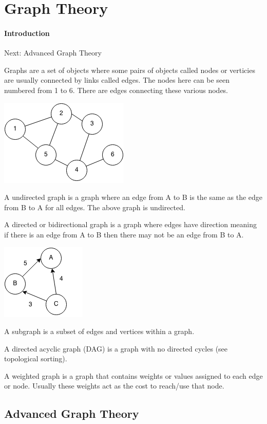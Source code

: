 \documentclass[11pt,oneside]{book}
\makeatletter
\def\maxwidth#1{\ifdim\Gin@nat@width>#1 #1\else\Gin@nat@width\fi}
\makeatother
\begin{document}
\chapter{Graph Theory}\subsubsection{Introduction}

Next: Advanced Graph Theory

Graphs are a set of objects where some pairs of objects  called nodes or verticies are usually connected by links called edges. The nodes here can be seen numbered from 1 to 6. There are edges connecting these various nodes.

\includegraphics[width=\maxwidth{\textwidth}]{graph.png}

A undirected graph is a graph where an edge from A to B is the same as the edge from B to A for all edges. The above graph is undirected.

A directed or bidirectional graph is a graph where edges have direction meaning if there is an edge from A to B then there may not be an edge from B to A.

\includegraphics[width=\maxwidth{\textwidth}]{digraph.png}

A subgraph is a subset of edges and vertices within a graph.

A directed acyclic graph (DAG) is a graph with no directed cycles (see topological sorting).

A weighted graph is a graph that contains weights or values assigned to each edge or node. Usually these weights act as the cost to reach/use that node.

\section{Advanced Graph Theory}
\end{document}
